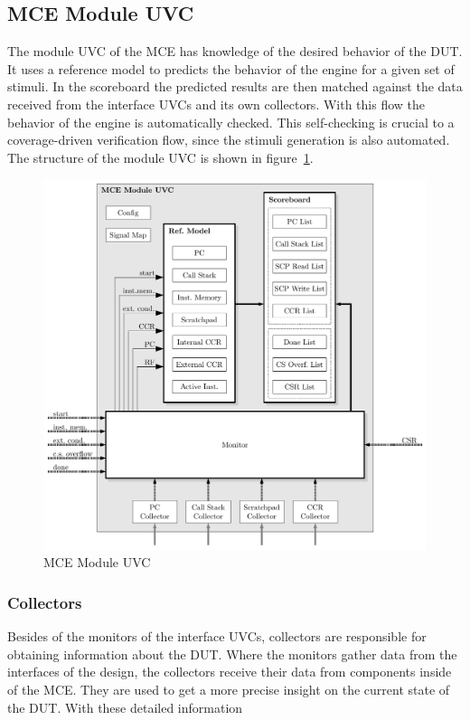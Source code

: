 \subsection{MCE Module UVC}

The module UVC of the MCE has knowledge of the desired behavior of the DUT.
It uses a reference model to predicts the behavior of the engine for a given set of stimuli.
In the scoreboard the predicted results are then matched against the data received from the interface UVCs and its own collectors.
With this flow the behavior of the engine is automatically checked.
This self-checking is crucial to a coverage-driven verification flow, since the stimuli generation is also automated.
The structure of the module UVC is shown in figure~\ref{fig:module_uvc}.

\begin{figure}[htb]
 \centering
 \includegraphics[width=1.0\textwidth,angle=0]{images/mce_module_uvc}
 \caption{MCE Module UVC}
\label{fig:module_uvc}
\end{figure}

\subsubsection{Collectors}

Besides of the monitors of the interface UVCs, collectors are responsible for obtaining information about the DUT.
Where the monitors gather data from the interfaces of the design, the collectors receive their data from components inside of the MCE.
They are used to get a more precise insight on the current state of the DUT.
With these detailed information 
 

